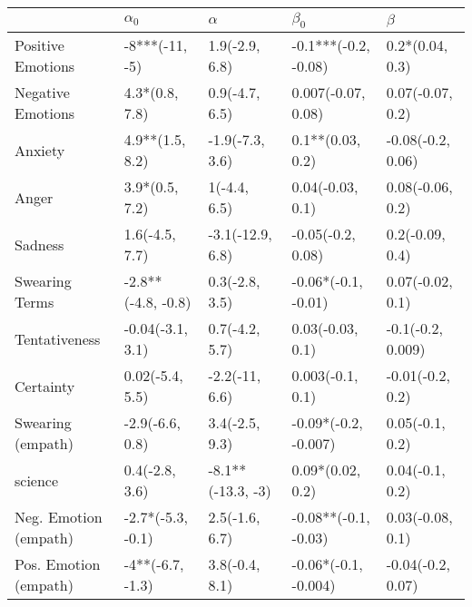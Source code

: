 \begin{tabular}{lllll}
\toprule
{} &          $\alpha_0$ &           $\alpha$ &             $\beta_0$ &            $\beta$ \\
\midrule
Positive Emotions     &      -8***(-11, -5) &     1.9(-2.9, 6.8) &  -0.1***(-0.2, -0.08) &    0.2*(0.04, 0.3) \\
Negative Emotions     &      4.3*(0.8, 7.8) &     0.9(-4.7, 6.5) &    0.007(-0.07, 0.08) &   0.07(-0.07, 0.2) \\
Anxiety               &     4.9**(1.5, 8.2) &    -1.9(-7.3, 3.6) &      0.1**(0.03, 0.2) &  -0.08(-0.2, 0.06) \\
Anger                 &      3.9*(0.5, 7.2) &       1(-4.4, 6.5) &      0.04(-0.03, 0.1) &   0.08(-0.06, 0.2) \\
Sadness               &      1.6(-4.5, 7.7) &   -3.1(-12.9, 6.8) &     -0.05(-0.2, 0.08) &    0.2(-0.09, 0.4) \\
Swearing Terms        &  -2.8**(-4.8, -0.8) &     0.3(-2.8, 3.5) &   -0.06*(-0.1, -0.01) &   0.07(-0.02, 0.1) \\
Tentativeness         &    -0.04(-3.1, 3.1) &     0.7(-4.2, 5.7) &      0.03(-0.03, 0.1) &  -0.1(-0.2, 0.009) \\
Certainty             &     0.02(-5.4, 5.5) &     -2.2(-11, 6.6) &      0.003(-0.1, 0.1) &   -0.01(-0.2, 0.2) \\
Swearing (empath)     &     -2.9(-6.6, 0.8) &     3.4(-2.5, 9.3) &  -0.09*(-0.2, -0.007) &    0.05(-0.1, 0.2) \\
science               &      0.4(-2.8, 3.6) &  -8.1**(-13.3, -3) &      0.09*(0.02, 0.2) &    0.04(-0.1, 0.2) \\
Neg. Emotion (empath) &   -2.7*(-5.3, -0.1) &     2.5(-1.6, 6.7) &  -0.08**(-0.1, -0.03) &   0.03(-0.08, 0.1) \\
Pos. Emotion (empath) &    -4**(-6.7, -1.3) &     3.8(-0.4, 8.1) &  -0.06*(-0.1, -0.004) &  -0.04(-0.2, 0.07) \\
\bottomrule
\end{tabular}
